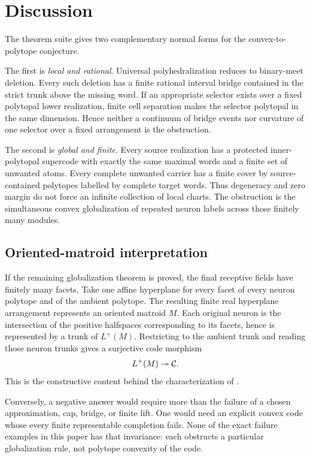 \section{Discussion}
\label{sec:discussion}

The theorem suite gives two complementary normal forms for the convex-to-polytope conjecture.

The first is \emph{local and rational}.  Universal polyhedralization reduces to binary-meet deletion.  Every such deletion has a finite rational interval bridge contained in the strict trunk above the missing word.  If an appropriate selector exists over a fixed polytopal lower realization, finite cell separation makes the selector polytopal in the same dimension.  Hence neither a continuum of bridge events nor curvature of one selector over a fixed arrangement is the obstruction.

The second is \emph{global and finite}.  Every source realization has a protected inner-polytopal supercode with exactly the same maximal words and a finite set of unwanted atoms.  Every complete unwanted carrier has a finite cover by source-contained polytopes labelled by complete target words.  Thus degeneracy and zero margin do not force an infinite collection of local charts.  The obstruction is the simultaneous convex globalization of repeated neuron labels across those finitely many modules.

\subsection{Oriented-matroid interpretation}

If the remaining globalization theorem is proved, the final receptive fields have finitely many facets.  Take one affine hyperplane for every facet of every neuron polytope and of the ambient polytope.  The resulting finite real hyperplane arrangement represents an oriented matroid $M$.  Each original neuron is the intersection of the positive halfspaces corresponding to its facets, hence is represented by a trunk of $L^+(M)$.  Restricting to the ambient trunk and reading those neuron trunks gives a surjective code morphism
\[
 L^+(M)\twoheadrightarrow\mathcal C.
\]
This is the constructive content behind the characterization of \citet{KuninLienkaemperRosen2023}.

Conversely, a negative answer would require more than the failure of a chosen approximation, cap, bridge, or finite lift.  One would need an explicit convex code whose every finite representable completion fails.  None of the exact failure examples in this paper has that invariance: each obstructs a particular globalization rule, not polytope convexity of the code.

